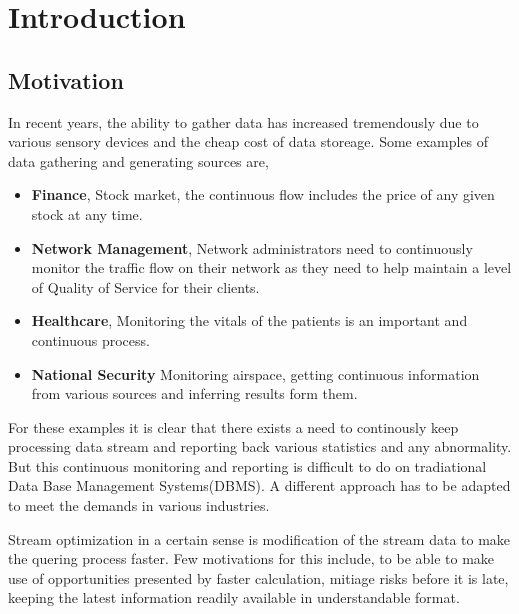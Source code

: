 \chapter{Introduction}
\label{chapter:Introduction}
\thispagestyle{myheadings}

\section{Motivation}
\label{sec:Motivation}
In recent years, the ability to gather data has increased tremendously due to various sensory devices and the cheap cost of data storeage. Some examples of data gathering and generating sources are,
\begin{itemize}
\item \textbf{Finance}, Stock market, the continuous flow includes the price of any given stock at any time. 
\item \textbf{Network Management}, Network administrators need to continuously monitor the traffic flow on their network as they need to help maintain a level of Quality of Service for their clients.
\item \textbf{Healthcare}, Monitoring the vitals of the patients is an important and continuous process. 
\item \textbf{National Security} Monitoring airspace, getting continuous information from various sources and inferring results form them.
\end{itemize} 
For these examples it is clear that there exists a need to continously keep processing data stream and reporting back various statistics and any abnormality. But this continuous monitoring and reporting is difficult to do on tradiational Data Base Management Systems(DBMS). A different approach has to be adapted to meet the demands in various industries.
\par Stream optimization in a certain sense is modification of the stream data to make the quering process faster. Few motivations for this include, to be able to make use of opportunities presented by faster calculation, mitiage risks before it is late, keeping the latest information readily available in understandable format.

